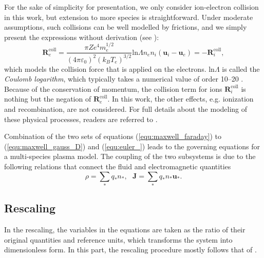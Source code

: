 \documentclass{article}
\begin{document}
For the sake of simplicity for presentation, we only consider ion-electron collision in this work, but extension to more species is straightforward. Under moderate assumptions, such collisions can be well modelled by frictions, and we simply present the expressions without derivation (see \citep[][sec. 5.6.2]{chen2016}):
\begin{equation} \label{equ:collision}
    \mathbf{R}_{e}^{\text{coll}} = \frac{\pi Ze^4m_e^{1/2}}{(4\pi\varepsilon_0)^2(k_BT_e)^{3/2}}\text{ln}\Lambda n_en_i(\mathbf{u}_i - \mathbf{u}_e) = - \mathbf{R}_{i}^{\text{coll}},  
\end{equation}
which models the collision force that is applied on the electrons. ln$\Lambda$ is called the \emph{Coulomb logarithm}, which typically takes a numerical value of order 10–20 . Because of the conservation of momentum, the collision term for ions $\mathbf{R}_{i}^{\text{coll}}$ is nothing but the negation of $\mathbf{R}_{e}^{\text{coll}}$. In this work, the other effects, e.g. ionization and recombination, are not considered. For full details about the modeling of these physical processes, readers are referred to \cite{fuchs_2021}.  


Combination of the two sets of equations (\ref{equ:maxwell_faraday}) to (\ref{equ:maxwell_gauss_D}) and (\ref{equ:euler_}) leads to the governing equations for a multi-species plasma model. The coupling of the two subsystems is due to the following relations that connect the fluid and electromagnetic quantities
\begin{equation} \label{equ:maxwell_euler_coupling}
    \rho = \sum_* q_*n_*, \ \ \  \mathbf{J} = \sum_* q_*n_*\mathbf{u}_*. 
\end{equation}

\subsection{Rescaling} \label{sec:rescaling}
In the rescaling, the variables in the equations are taken as the ratio of their original quantities and reference units, which transforms the system into dimensionless form. In this part, the rescaling procedure mostly follows that of \cite{degond_2017}.
\end{document}
